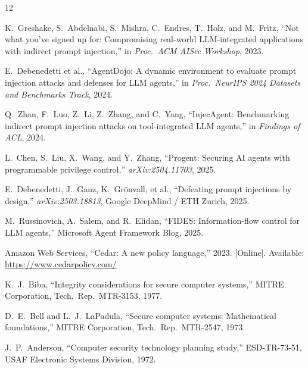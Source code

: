 \documentclass[10pt,conference]{IEEEtran}
\begin{document}
\begin{thebibliography}{12}

K.~Greshake, S.~Abdelnabi, S.~Mishra, C.~Endres, T.~Holz, and M.~Fritz,
``Not what you've signed up for: Compromising real-world LLM-integrated
applications with indirect prompt injection,''
in \emph{Proc.\ ACM AISec Workshop}, 2023.

E.~Debenedetti et al.,
``AgentDojo: A dynamic environment to evaluate prompt injection attacks and
defenses for LLM agents,''
in \emph{Proc.\ NeurIPS 2024 Datasets and Benchmarks Track}, 2024.

Q.~Zhan, F.~Luo, Z.~Li, Z.~Zhang, and C.~Yang,
``InjecAgent: Benchmarking indirect prompt injection attacks on
tool-integrated LLM agents,''
in \emph{Findings of ACL}, 2024.

L.~Chen, S.~Liu, X.~Wang, and Y.~Zhang,
``Progent: Securing AI agents with programmable privilege control,''
\emph{arXiv:2504.11703}, 2025.

E.~Debenedetti, J.~Ganz, K.~Gr\"{o}nvall, et al.,
``Defeating prompt injections by design,''
\emph{arXiv:2503.18813}, Google DeepMind / ETH Zurich, 2025.

M.~Russinovich, A.~Salem, and R.~Elidan,
``FIDES: Information-flow control for LLM agents,''
Microsoft Agent Framework Blog, 2025.

Amazon Web Services,
``Cedar: A new policy language,'' 2023.
[Online]. Available: \url{https://www.cedarpolicy.com/}

K.~J.~Biba,
``Integrity considerations for secure computer systems,''
MITRE Corporation, Tech.\ Rep.\ MTR-3153, 1977.

D.~E.~Bell and L.~J.~LaPadula,
``Secure computer systems: Mathematical foundations,''
MITRE Corporation, Tech.\ Rep.\ MTR-2547, 1973.

J.~P.~Anderson,
``Computer security technology planning study,''
ESD-TR-73-51, USAF Electronic Systems Division, 1972.

\end{thebibliography}
\end{document}
